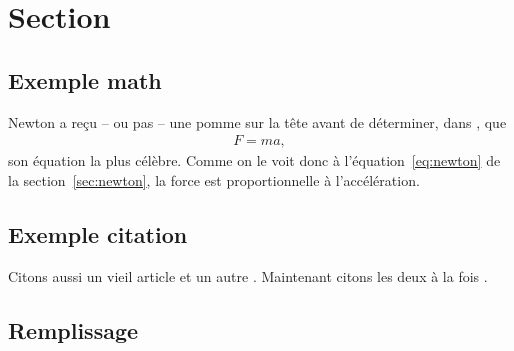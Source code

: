 \begin{comment}
\end{comment}

\section{Section}
\subsection{Exemple math \label{sec:newton}}
Newton a reçu -- ou pas -- une pomme sur la tête avant de déterminer, dans \cite{newton1687philosophiae}, que
\begin{align}
    \label{eq:newton}
F=ma,
\end{align}
son équation la plus célèbre. Comme on le voit donc à l'équation~\eqref{eq:newton} de la section~\ref{sec:newton}, la force est proportionnelle à l'accélération.

\subsection{Exemple citation}
Citons aussi un vieil article \cite{andreev1964} et un autre \cite{robertson1929}. Maintenant citons les deux à la fois \cite{andreev1964, robertson1929}.

\subsection{Remplissage}
\kant[8-10]

